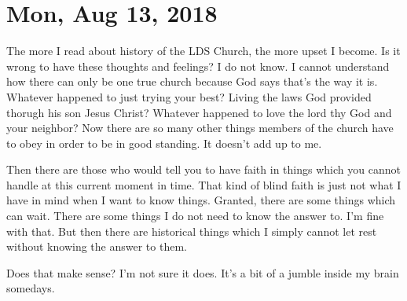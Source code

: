 \section{Mon, Aug 13, 2018}

The more I read about history of the LDS Church, the more upset I become. Is it wrong
to have these thoughts and feelings? I do not know. I cannot understand how there can
only be one true church because God says that's the way it is. Whatever happened to
just trying your best? Living the laws God provided thorugh his son Jesus Christ?
Whatever happened to love the lord thy God and your neighbor? Now there are so many
other things members of the church have to obey in order to be in good standing. It
doesn't add up to me.

Then there are those who would tell you to have faith in things which you cannot
handle at this current moment in time. That kind of blind faith is just not what I
have in mind when I want to know things. Granted, there are some things which can
wait. There are some things I do not need to know the answer to. I'm fine with that.
But then there are historical things which I simply cannot let rest without knowing
the answer to them.

Does that make sense? I'm not sure it does. It's a bit of a jumble inside my brain
somedays.